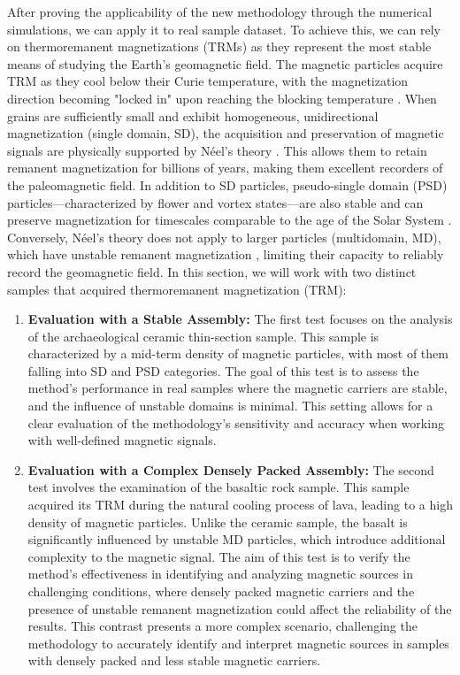 After proving the applicability of the new methodology through the numerical simulations, we can apply it to real sample dataset. To achieve this, we can rely on thermoremanent magnetizations (TRMs) as they represent the most stable means of studying the Earth's geomagnetic field. The magnetic particles \citep[most commonly magnetite,][]{OReilly1984} acquire TRM as they cool below their Curie temperature, with the magnetization direction becoming "locked in" upon reaching the blocking temperature \citep{Dunlop1997}. When grains are sufficiently small and exhibit homogeneous, unidirectional magnetization (single domain, SD), the acquisition and preservation of magnetic signals are physically supported by Néel’s theory \citep{Neel1949, Neel1955}. This allows them to retain remanent magnetization for billions of years, making them excellent recorders of the paleomagnetic field. In addition to SD particles, pseudo-single domain (PSD) particles—characterized by flower and vortex states—are also stable and can preserve magnetization for timescales comparable to the age of the Solar System \citep{Nagy2017, Lascu2018}. Conversely, Néel’s theory does not apply to larger particles (multidomain, MD), which have unstable remanent magnetization \citep[e.g., due to viscous domain reorganization,][]{DeGroot2014}, limiting their capacity to reliably record the geomagnetic field. In this section, we will work with two distinct samples that acquired thermoremanent magnetization (TRM):

\begin{enumerate}
\item \textbf{Evaluation with a Stable Assembly:}
The first test focuses on the analysis of the archaeological ceramic thin-section sample. This sample is characterized by a mid-term density of magnetic particles, with most of them falling into SD and PSD categories. The goal of this test is to assess the method’s performance in real samples where the magnetic carriers are stable, and the influence of unstable domains is minimal. This setting allows for a clear evaluation of the methodology’s sensitivity and accuracy when working with well-defined magnetic signals.

\item \textbf{Evaluation with a Complex Densely Packed Assembly:}
The second test involves the examination of the basaltic rock sample. This sample acquired its TRM during the natural cooling process of lava, leading to a high density of magnetic particles. Unlike the ceramic sample, the basalt is significantly influenced by unstable MD particles, which introduce additional complexity to the magnetic signal. The aim of this test is to verify the method’s effectiveness in identifying and analyzing magnetic sources in challenging conditions, where densely packed magnetic carriers and the presence of unstable remanent magnetization could affect the reliability of the results. This contrast presents a more complex scenario, challenging the methodology to accurately identify and interpret magnetic sources in samples with densely packed and less stable magnetic carriers.
\end{enumerate}



